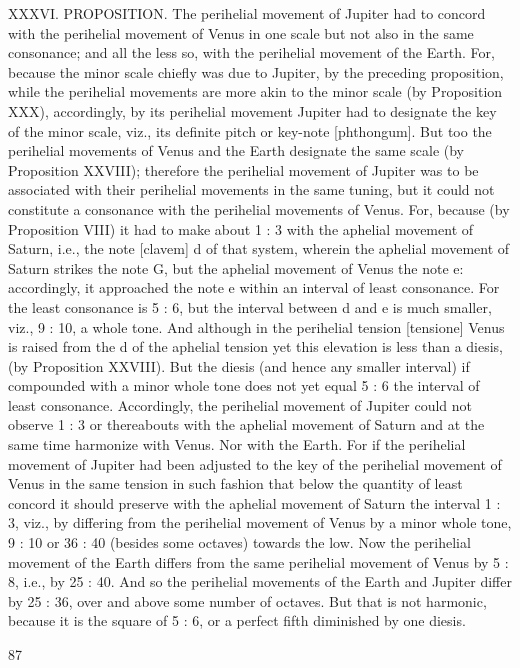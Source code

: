 \documentclass{article}
\begin{document}
XXXVI. PROPOSITION. The perihelial movement of Jupiter had to
concord with the perihelial movement of Venus in one scale but not also
in the same consonance; and all the less so, with the perihelial
movement of the Earth.
For, because the minor scale chiefly was due to Jupiter, by the preceding
proposition, while the perihelial movements are more akin to the minor
scale (by Proposition XXX), accordingly, by its perihelial movement
Jupiter had to designate the key of the minor scale, viz., its definite pitch
or key-note [phthongum]. But too the perihelial movements of Venus
and the Earth designate the same scale (by Proposition XXVIII);
therefore the perihelial movement of Jupiter was to be associated with
their perihelial movements in the same tuning, but it could not
constitute a consonance with the perihelial movements of Venus. For,
because (by Proposition VIII) it had to make about 1 : 3 with the aphelial
movement of Saturn, i.e., the note [clavem] d of that system, wherein the
aphelial movement of Saturn strikes the note G, but the aphelial
movement of Venus the note e: accordingly, it approached the
note e within an interval of least consonance. For the least consonance is
5 : 6, but the interval between d and e is much smaller, viz., 9 : 10, a
whole tone. And although in the perihelial tension [tensione] Venus is
raised from the d of the aphelial tension yet this elevation is less than a
diesis, (by Proposition XXVIII). But the diesis (and hence any smaller
interval) if compounded with a minor whole tone does not yet equal 5 : 6
the interval of least consonance. Accordingly, the perihelial movement of
Jupiter could not observe 1 : 3 or thereabouts with the aphelial
movement of Saturn and at the same time harmonize with Venus. Nor
with the Earth. For if the perihelial movement of Jupiter had been
adjusted to the key of the perihelial movement of Venus in the same
tension in such fashion that below the quantity of least concord it should
preserve with the aphelial movement of Saturn the interval 1 : 3, viz., by
differing from the perihelial movement of Venus by a minor whole tone,
9 : 10 or 36 : 40 (besides some octaves) towards the low. Now the
perihelial movement of the Earth differs from the same perihelial
movement of Venus by 5 : 8, i.e., by 25 : 40. And so the perihelial
movements of the Earth and Jupiter differ by 25 : 36, over and above
some number of octaves. But that is not harmonic, because it is the
square of 5 : 6, or a perfect fifth diminished by one diesis.


87
\end{document}
